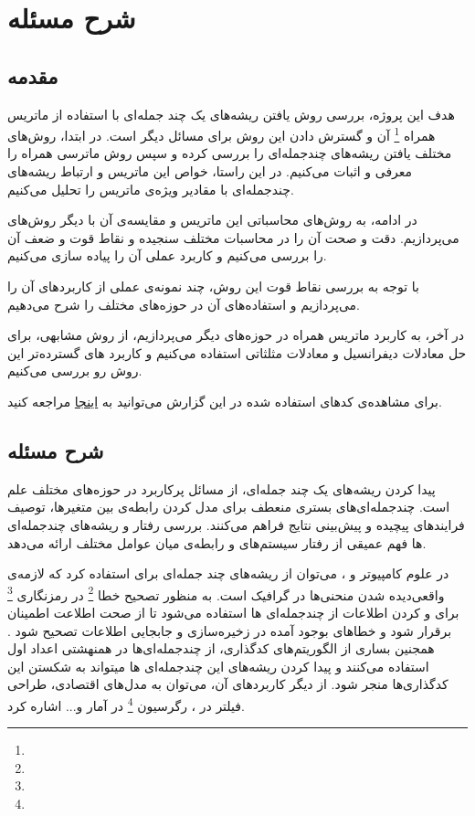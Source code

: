 \chapter{شرح مسئله}

\section{مقدمه}
هدف این پروژه، بررسی روش یافتن ریشه‌های یک چند جمله‌ای با استفاده از ماتریس همراه
\footnote{
}
آن
و گسترش دادن این روش برای مسائل دیگر است.
در ابتدا، روش‌های مختلف یافتن ریشه‌های چند‌جمله‌ای را بررسی کرده و سپس روش ماترسی همراه را معرفی و اثبات می‌کنیم.
در این راستا، خواص این ماتریس  و ارتباط ریشه‌های چندجمله‌ای با مقادیر ویژه‌ی ماتریس را تحلیل می‌کنیم.

در ادامه، به روش‌های محاسباتی این ماتریس و مقایسه‌ی آن با دیگر روش‌های می‌پردازیم.
دقت و صحت آن را در محاسبات مختلف سنجیده و نقاط قوت و ضعف آن را بررسی می‌کنیم
و کاربرد عملی آن را پیاده سازی می‌کنیم.

با توجه به بررسی نقاط قوت این روش، چند نمونه‌ی عملی از کاربرد‌های آن را می‌پردازیم و استفاده‌های آن در حوزه‌های مختلف را شرح می‌دهیم.

در آخر، به کاربرد ماتریس همراه در حوزه‌های دیگر می‌پردازیم،
از روش مشابهی،‌ برای حل معادلات دیفرانسیل و معادلات مثلثاتی استفاده می‌کنیم و کاربرد های گسترده‌تر این روش رو بررسی می‌کنیم.

برای مشاهده‌ی کد‌های استفاده شده در این گزارش می‌توانید به
\href{https://github.com/atrin-hojjat/PolyRootsWithCompanionMatrix}{اینجا}
مراجعه کنید.

\section{شرح مسئله}
پیدا کردن ریشه‌های یک چند جمله‌ای، از مسائل پر‌کاربرد در حوزه‌‌های مختلف علم است.
چند‌جمله‌ای‌های بستری منعطف برای مدل کردن رابطه‌ی بین متغیر‌ها، توصیف فرایند‌های پیچیده و پیش‌بینی نتایج فراهم می‌کنند.
بررسی رفتار و ریشه‌های چندجمله‌ای ها فهم عمیقی از رفتار سیستم‌های و رابطه‌ی میان عوامل مختلف ارائه می‌دهد.


در علوم کامپیوتر و
،
می‌توان از ریشه‌های چند جمله‌ای برای
استفاده کرد که لازمه‌ی واقعی‌دیده شدن منحنی‌ها در گرافیک است.
به منظور
تصحیح خطا
\footnote{}
در
رمزنگاری
\footnote{}
برای
و
کردن اطلاعات از چند‌جمله‌ای ها استفاده می‌شود تا از صحت اطلاعت اطمینان برقرار شود و خطا‌های بوجود آمده در زخیره‌سازی و جابجایی اطلاعات تصحیح شود
\cite{FUJIWARA1990171}
.
همجنین بساری از الگوریتم‌های کد‌گذاری، از چندجمله‌ای‌ها در همنهشتی اعداد اول استفاده می‌کنند و پیدا کردن ریشه‌های این چند‌جمله‌ای ها میتواند به شکستن این کدگذاری‌ها منجر شود.
از دیگر کاربرد‌های آن، می‌توان به مدل‌های اقتصادی، طراحی فیلتر در
،
رگرسیون
\footnote{}
در آمار
و...
اشاره کرد.


